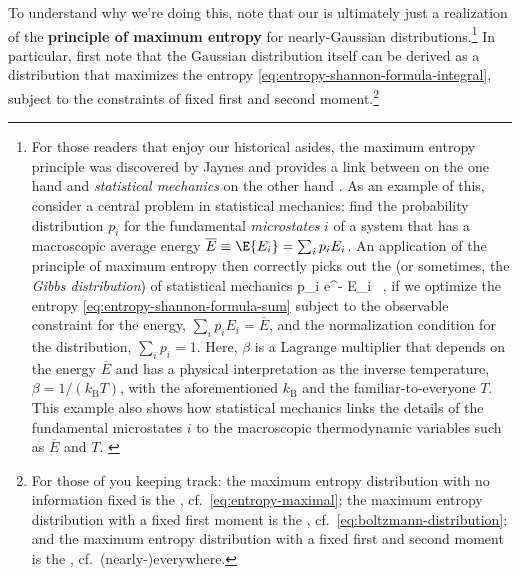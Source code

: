 To understand why we're doing this, note that our  is ultimately just a realization of the \textbf{principle of maximum entropy} for nearly-Gaussian distributions.\footnote{For those readers that enjoy our historical asides, the maximum entropy principle was discovered by Jaynes 
    and provides a link between  on the one hand and \emph{statistical mechanics} on the other hand \cite{PhysRev.106.620,PhysRev.108.171}.
As an example of this, consider a central problem in statistical mechanics: find the probability
distribution $p_i$ for the fundamental \emph{microstates} $i$ of a system that has a macroscopic average energy $\overline{E}\equiv \E{E_i}=\sum_{i} p_i E_i$. An application of the principle of maximum entropy then correctly picks out the   (or sometimes, the \emph{Gibbs distribution})  of statistical mechanics
\be\label{eq:boltzmann-distribution}
p_i \propto e^{- \beta E_i} \, ,
\ee
if we optimize the entropy \eqref{eq:entropy-shannon-formula-sum} subject to the observable constraint for the energy, $\sum_{i} p_i E_i=\overline{E}$, and the normalization condition for the distribution, $\sum_{i} p_i=1$.
Here, $\beta$ is a Lagrange multiplier that depends on the energy $\overline{E}$ and has a physical interpretation as the inverse temperature, $\beta=1/(k_{\text{B}}T)$, with the aforementioned  $k_{\text{B}}$ and the familiar-to-everyone  $T$. This example also shows how statistical mechanics links the details of the fundamental microstates $i$ to the macroscopic thermodynamic variables such as $\overline{E}$ and $T$.
\label{foot:gibbs}
} In particular, first note that the Gaussian distribution itself can be derived as a distribution that maximizes the entropy \eqref{eq:entropy-shannon-formula-integral}, subject to the constraints of fixed first and second moment.\footnote{
    For those of you keeping track: the maximum entropy distribution with no information fixed is the , cf.~\eqref{eq:entropy-maximal}; the maximum entropy distribution with a fixed first moment is the , cf.~\eqref{eq:boltzmann-distribution}; and the maximum entropy distribution with a fixed first and second moment is the , cf.~(nearly-)everywhere.
}
